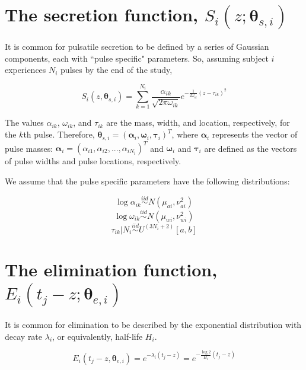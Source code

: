 \documentclass[11pt]{book}
\begin{document}
\section{The secretion function, $S_i(z;\boldsymbol{\theta}_{s,i})$} It is common for pulsatile secretion to be defined by a series of Gaussian components, each with ``pulse specific" parameters. So, assuming subject $i$ experiences $N_i$ pulses by the end of the study,


\begin{equation}
S_i(z,\boldsymbol{\theta}_{s,i}) = \sum_{k=1}^{N_i}  \frac{\alpha_{ik}}{\sqrt{2\pi\omega_{ik}}}e^{-\frac{1}{2\omega_{ik}}(z-\tau_{ik})^2}
\label{eq:Secretion}
\end{equation}


The values $\alpha_{ik}$, $\omega_{ik}$, and $\tau_{ik}$ are the mass, width, and location, respectively, for the $k$th pulse. Therefore, $\boldsymbol{\theta}_{s,i} = (\boldsymbol{\alpha}_i,\boldsymbol{\omega}_i,\boldsymbol{\tau}_i)^T$, where $\boldsymbol{\alpha}_i$ represents the vector of pulse masses: $\boldsymbol{\alpha}_i = (\alpha_{i1},\alpha_{i2},...,\alpha_{iN_i})^T$ and $\boldsymbol{\omega}_i$ and $\boldsymbol{\tau}_i$ are defined as the vectors of pulse widths and pulse locations, respectively.


We assume that the pulse specific parameters have the following distributions:


$$
\log \alpha_{ik} \stackrel{iid}{\sim} N(\mu_{ai},\nu^2_{ai})
$$
$$
\log \omega_{ik} \stackrel{iid}{\sim} N(\mu_{wi}, \nu^2_{wi})
$$
$$
\tau_{ik}|N_i \stackrel{iid}{\sim} U^{(3N_i + 2)}[a,b]
$$


\section{The elimination function, $E_i(t_j-z;\boldsymbol{\theta}_{e,i})$} It is common for elimination to be described by the exponential distribution with decay rate $\lambda_i$, or equivalently, half-life $H_i$.


\begin{equation}
E_i(t_j-z,\boldsymbol{\theta}_{e,i}) =e^{-\lambda_i(t_j-z)} = e^{-\frac{\log 2}{H_i}(t_j-z)}
\label{eq:Elimination}
\end{equation}
\end{document}

